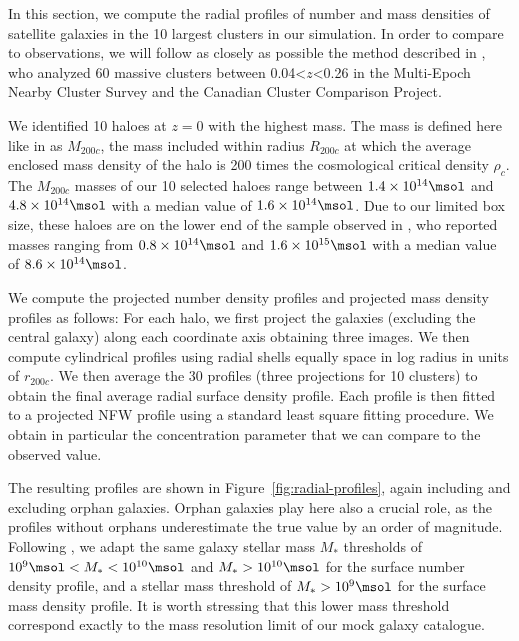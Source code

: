 In this  section, we compute  the radial  profiles of number  and mass
densities  of satellite  galaxies in  the 10  largest clusters  in our
simulation. In  order to  compare to observations,  we will  follow as
closely      as     possible      the     method      described     in
\citet{vanderburgEvidenceInsideoutGrowth2015}, who analyzed 60 massive
clusters between 0.04<$z$<0.26 in  the Multi-Epoch Nearby Cluster Survey
and the Canadian Cluster Comparison Project.

We identified 10  haloes at $z=0$ with the highest  mass.  The mass is
defined here like  in \citet{vanderburgEvidenceInsideoutGrowth2015} as
$M_{200c}$, the  mass included within  radius $R_{200c}$ at  which the
average  enclosed  mass   density  of  the  halo  is   200  times  the
cosmological critical density $\rho_c$.   The $M_{200c}$ masses of our
10 selected  haloes range between  $1.4 \times 10^{14}\msol$  and $4.8
\times 10^{14}\msol$ with a median value of $1.6 \times 10^{14}\msol$.
Due to our limited box size, these  haloes are on the lower end of the
sample observed  in \citet{vanderburgEvidenceInsideoutGrowth2015}, who
reported masses ranging from $0.8 \times 10^{14}\msol$ and $1.6 \times
10^{15}\msol$ with a median value of $8.6 \times 10^{14}\msol$.

We compute  the projected number  density profiles and  projected mass
density  profiles as  follows: For  each  halo, we  first project  the
galaxies  (excluding the  central galaxy)  along each  coordinate axis
obtaining three  images.  We  then compute cylindrical  profiles using
radial shells equally space in log  radius in units of $r_{200c}$.  We
then average  the 30 profiles  (three projections for 10 clusters) to
obtain the final average radial surface density profile.  Each profile
is then fitted to a projected NFW profile \citep{navarroStructureColdDark1996b} using a
standard least square fitting procedure.   We obtain in particular the
concentration parameter that we can compare to the observed value.

The resulting profiles  are shown in Figure~\ref{fig:radial-profiles},
again including  and excluding  orphan galaxies. Orphan  galaxies play
here  also   a  crucial   role,  as   the  profiles   without  orphans
underestimate  the true  value by  an order  of magnitude.   Following
\citet{vanderburgEvidenceInsideoutGrowth2015},   we  adapt   the  same
galaxy  stellar   mass  $M_*$  thresholds   of  $10^9\msol  <   M_*  <
10^{10}\msol$ and $M_* > 10^{10}\msol$  for the surface number density
profile, and  a stellar mass threshold  of $M_* > 10^9  \msol$ for the
surface mass  density profile. It  is worth stressing that  this lower
mass threshold correspond exactly to  the mass resolution limit of our
mock galaxy catalogue.

